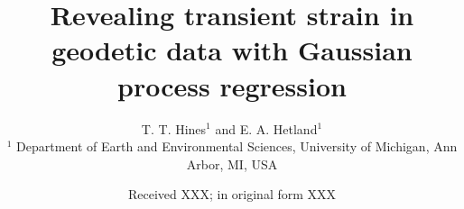 \documentclass[extra,mreferee]{gji}
\title[Transient strain in geodetic data]
      {Revealing transient strain in geodetic data with Gaussian process regression}
\author[T. T. Hines and E. A. Hetland]
       {T. T. Hines$^1$ and E. A. Hetland$^1$ \\
        $^1$ Department of Earth and Environmental Sciences, University of Michigan, Ann Arbor, MI, USA}
\date{Received XXX; in original form XXX}
\providecommand{\DIFaddbegin}{} %
\begin{document}
\label{firstpage}

\maketitle

\DIFaddbegin \newcommand{\pos}{\vec{x}} %
\newcommand{\data}{\mitbf{d}} %
\newcommand{\post}{\hat{u}} %
\newcommand{\points}{\mitbf{P}} %
\newcommand{\strain}{\dot\varepsilon} %
\newcommand{\E}[1]{\mathrm{E}\left[ #1 \right]} %
\newcommand{\Cov}[1]{\mathrm{Cov}\left[ #1 \right]} %
\newcommand{\e}{\mathrm{e}} %
\newcommand{\n}{\mathrm{n}} %
\newcommand{\G}{\mitbf{G}} %
\newcommand{\zeros}{\mitbf{0}} %
\newcommand{\eye}{\mitbf{I}} %
\end{document}
